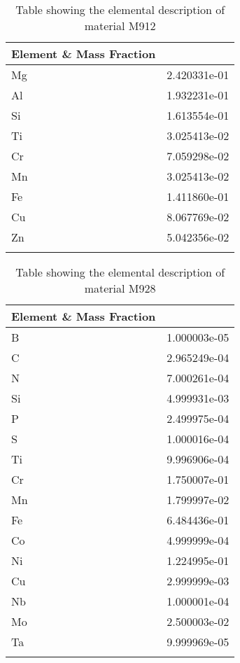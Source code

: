 \begin{centering}
\begin{longtable}[ht!]
  { p{} | p{} }
\hline
Element \& Mass Fraction\\
\hline
Mg &  2.420331e-01\\
Al &  1.932231e-01\\
Si &  1.613554e-01\\
Ti &  3.025413e-02\\
Cr &  7.059298e-02\\
Mn &  3.025413e-02\\
Fe &  1.411860e-01\\
Cu &  8.067769e-02\\
Zn &  5.042356e-02\\
\caption{Table showing the elemental description of material M912}
\label{table:material_UppExFrames}
\end{longtable}
\clearpage

\begin{longtable}[ht!]
{ p{} | p{} }
\hline
Element \& Mass Fraction\\
\hline
B &  1.000003e-05\\
C &  2.965249e-04\\
N &  7.000261e-04\\
Si &  4.999931e-03\\
P &  2.499975e-04\\
S &  1.000016e-04\\
Ti &  9.996906e-04\\
Cr &  1.750007e-01\\
Mn &  1.799997e-02\\
Fe &  6.484436e-01\\
Co &  4.999999e-04\\
Ni &  1.224995e-01\\
Cu &  2.999999e-03\\
Nb &  1.000001e-04\\
Mo &  2.500003e-02\\
Ta &  9.999969e-05\\
\caption{Table showing the elemental description of material M928}
\label{table:material_PPF}
\end{longtable}
\clearpage


\end{centering}
